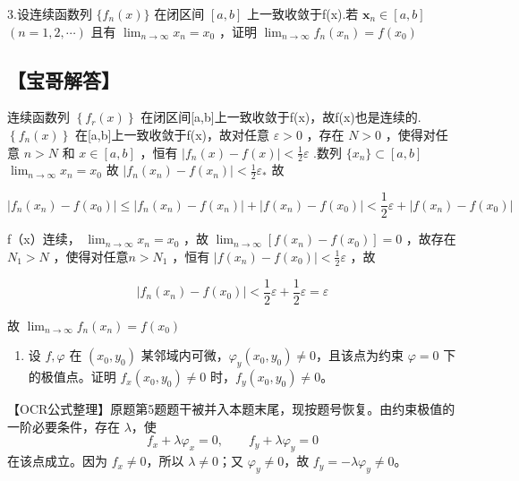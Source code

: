 \documentclass[11pt,fontset=fandol]{ctexart}
\providecommand{\tightlist}{\setlength{\itemsep}{0pt}\setlength{\parskip}{0pt}}
\begin{document}
3.设连续函数列 \(\{ f _ { n } ( x ) \}\) 在闭区间
\(\textstyle { \left[ a , b \right] }\) 上一致收敛于f(x).若
\(\boldsymbol { x } _ { n } \in \left[ a , b \right]\)
\(( n = 1 , 2 , \cdots )\) 且有
\(\lim _ { n \to \infty } x _ { n } = x _ { 0 }\) ，证明
\(\lim _ { n \to \infty } f _ { n } ( x _ { n } ) = f ( x _ { 0 } )\)

\subsection{【宝哥解答】}\label{ux5b9dux54e5ux89e3ux7b54-4}

连续函数列 \(\left\{ f _ { r } ( x ) \right\}\)
在闭区间{[}a,b{]}上一致收敛于f(x)，故f(x)也是连续的.\(\left\{ f _ { n } ( x ) \right\}\)
在{[}a,b{]}上一致收敛于f(x)，故对任意 \(\varepsilon > 0\) ，存在
\(N > 0\) ，使得对任意 \(n > N\) 和 \(x \in \left[ a , b \right]\)
，恒有 \(| f _ { n } ( x ) - f ( x ) | < \frac { 1 } { 2 } \varepsilon\)
.数列 \(\{ x _ { n } \} \subset [ a , b ]\)
\(\lim _ { n \to \infty } x _ { n } = x _ { 0 }\) 故
\(\left| f _ { n } ( x _ { n } ) - f ( x _ { n } ) \right| < { \frac { 1 } { 2 } } \varepsilon _ { \ast }\)
故

\[
| f _ { n } ( x _ { n } ) { - } f ( x _ { 0 } ) | \leq | f _ { n } ( x _ { n } ) - f ( x _ { n } ) | + | f ( x _ { n } ) - f ( x _ { 0 } ) | < { \frac { 1 } { 2 } } \varepsilon + | f ( x _ { n } ) - f ( x _ { 0 } ) |
\]

f（x）连续， \(\lim _ { n \to \infty } x _ { n } = x _ { 0 }\) ，故
\(\lim _ { n \to \infty } \left[ f ( x _ { n } ) - f ( x _ { 0 } ) \right] = 0\)
，故存在 \(N _ { 1 } > N\) ，使得对任意\(n > N _ { 1 }\) ，恒有
\(\left| f ( x _ { n } ) - f ( x _ { 0 } ) \right| < { \frac { 1 } { 2 } } \varepsilon\)
，故

\[
\left| f _ { n } ( x _ { n } ) - f ( x _ { 0 } ) \right| < { \frac { 1 } { 2 } } \varepsilon + { \frac { 1 } { 2 } } \varepsilon = \varepsilon
\]

故 \(\lim _ { n \to \infty } f _ { n } ( x _ { n } ) = f ( x _ { 0 } )\)

\begin{enumerate}
\def\labelenumi{\arabic{enumi}.}
\setcounter{enumi}{3}
\tightlist
\item
  设 \(f,\varphi\) 在 \((x_0,y_0)\)
  某邻域内可微，\(\varphi_y(x_0,y_0)\ne0\)，且该点为约束 \(\varphi=0\)
  下的极值点。证明 \(f_x(x_0,y_0)\ne0\) 时，\(f_y(x_0,y_0)\ne0\)。
\end{enumerate}

【OCR公式整理】原题第5题题干被并入本题末尾，现按题号恢复。由约束极值的一阶必要条件，存在
\(\lambda\)，使 \[
f_x+\lambda\varphi_x=0,\qquad f_y+\lambda\varphi_y=0
\] 在该点成立。因为 \(f_x\ne0\)，所以 \(\lambda\ne0\)；又
\(\varphi_y\ne0\)，故 \(f_y=-\lambda\varphi_y\ne0\)。
\end{document}
